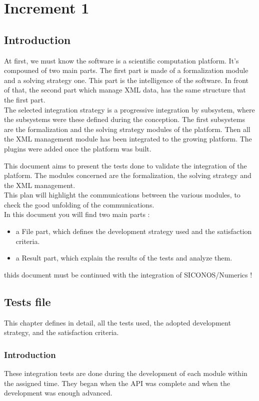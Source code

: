 \section{Increment 1}

\subsection{Introduction}
At first, we must know the software is a scientific computation platform. It's compouned of two main parts. The first part is made of a
formalization module and a solving strategy one. This part is the intelligence of the software. In front of that, the second part which
manage XML data, has the same structure that the first part.\\
The selected integration strategy is a progressive integration by subsystem, where the subsystems were these defined during the
conception. The first subsystems are the formalization  and the solving strategy modules of the platform. Then all the XML management
module has been integrated to the growing platform. The plugins were added once the platform was built.

This document aims to present the tests done to validate the integration of the platform. The modules concerned are the formalization,
the solving strategy and the XML management.\\
This plan will highlight the communications between the various modules, to check the good unfolding of the communications.\\
In this document you will find two main parts :
\begin{itemize}
	\item a File part, which defines the development strategy used and the satisfaction criteria.
	\item a Result part, which explain the results of the tests and analyze them.
\end{itemize}

\begin{ndr}
thids document must be continued with the integration of SICONOS/Numerics !
\end{ndr}


\subsection{Tests file}
This chapter defines in detail, all the tests used, the adopted development strategy, and the satisfaction criteria.

\subsubsection{Introduction}
These integration tests are done during the development of each module within the assigned time. They began when the API was complete and
when the development was enough advanced.


